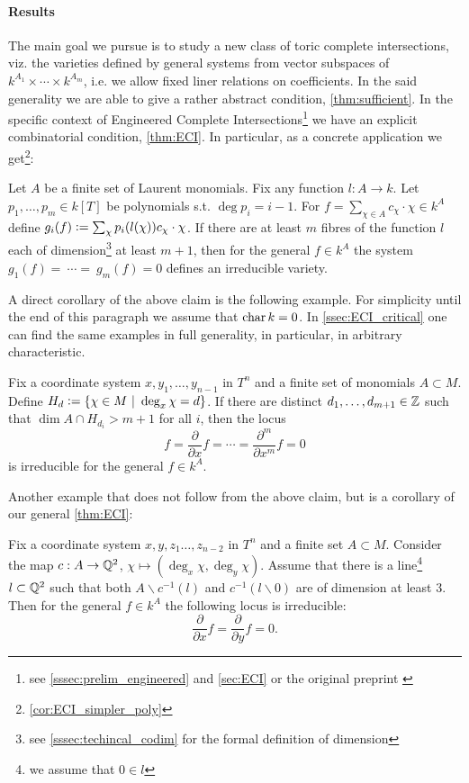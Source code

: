 \paragraph{Results} The main goal we pursue is to study a new class of toric complete intersections, viz. the varieties defined by general systems from vector subspaces of $k^{A_1} \times \cdots \times k^{A_m}$, i.e. we allow fixed liner relations on coefficients. In the said generality we are able to give a rather abstract  condition, \autoref{thm:sufficient}. In the specific context of Engineered Complete Intersections\footnote{see \autoref{sssec:prelim_engineered} and \autoref{sec:ECI} or the original preprint \cite{Esterov2024}} we have an explicit combinatorial condition, \autoref{thm:ECI}. In particular, as a concrete application we get\footnote{\autoref{cor:ECI_simpler_poly}}:
\begin{claim*}
    Let $A$ be a finite set of Laurent monomials. Fix any function $l: A \to k$. Let $p_1, \dots, p_m \in k[T]$ be polynomials s.t. $\deg p_i = i - 1$. For $f = \sum_{\chi \in A} c_\chi \cdot \chi \in k^A$ define $g_i(f) \vcentcolon= \sum_\chi p_i(l(\chi)) c_\chi \cdot \chi$. If there are at least $m$ fibres of the function $l$ each of dimension\footnote{see \autoref{sssec:techincal_codim} for the formal definition of dimension} at least $m + 1$, then for the general $f \in k^A$ the system $g_1(f) = ~\cdots = ~g_m(f) = 0$ defines an irreducible variety.
\end{claim*}
A direct corollary of the above claim is the following example. For simplicity until the end of this paragraph we assume that $\operatorname{char} k = 0$. In \autoref{ssec:ECI_critical} one can find the same examples in full generality, in particular, in arbitrary characteristic.
\begin{example*}
    Fix a coordinate system $x, y_1, \dots, y_{n - 1}$ in $T^n$ and a finite set of monomials $A \subset M$. Define 
    $H_d \vcentcolon= \{ \chi \in M\ |\ \deg_x \chi = d\}$. 
    If there are distinct $d_1, \dots, d_{m + 1} \in \mathbb Z$ such that $\dim A \cap H_{d_i} > m + 1$ for all $i$, then the locus
    \[
    f = \frac{\partial}{\partial x}f = \cdots = \frac{\partial^m}{\partial x^m} f = 0
    \]
    is irreducible for the general $f \in k^A$.
\end{example*}

Another example that does not follow from the above claim, but is a corollary of our general \autoref{thm:ECI}:
\begin{example*}
    Fix a coordinate system $x, y, z_1 \dots, z_{n - 2}$ in $T^n$ and a finite set $A \subset M$. Consider the map $c: A \to \mathbb Q^2$, $\chi \mapsto (\deg_x \chi, \deg_y \chi)$. Assume that there is a line\footnote{we assume that $0 \in l$} $l \subset \mathbb Q^2$ such that both $A \backslash c^{-1}(l)$ and $c^{-1} (l \backslash 0)$ are of dimension at least 3. Then for the general $f \in k^A$ the following locus is irreducible:
    \[
    \frac{\partial}{\partial x} f = \frac{\partial}{\partial y} f = 0.
    \]
\end{example*}

